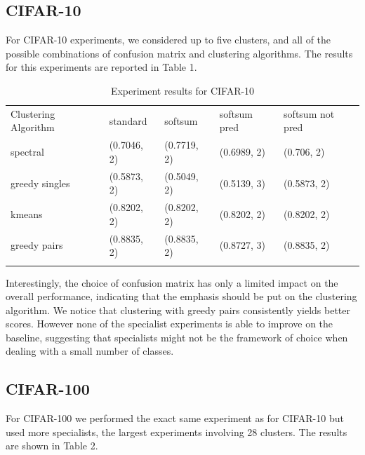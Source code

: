 \documentclass[graybox]{styles/svmult}
\begin{document}
\subsection{CIFAR-10}\label{cifar-10}

For CIFAR-10 experiments, we considered up to five clusters, and all of
the possible combinations of confusion matrix and clustering algorithms.
The results for this experiments are reported in Table 1.

\begin{table}
\caption{Experiment results for CIFAR-10}
\label{tab:1}       %
\begin{tabular}{p{3.2cm}p{2.0cm}p{2.0cm}p{2.0cm}p{2.0cm}}
\hline\noalign{\smallskip}
Clustering Algorithm & standard & softsum & softsum pred & softsum not pred \\
\noalign{\smallskip}\svhline\noalign{\smallskip}
spectral & (0.7046, 2) & (0.7719, 2) & (0.6989, 2) & (0.706, 2) \\
greedy singles & (0.5873, 2) & (0.5049, 2) & (0.5139, 3) & (0.5873, 2) \\
kmeans & (0.8202, 2) & (0.8202, 2) & (0.8202, 2) & (0.8202, 2) \\
greedy pairs & (0.8835, 2) & (0.8835, 2) & (0.8727, 3) & (0.8835, 2) \\
\noalign{\smallskip}\hline\noalign{\smallskip}
\end{tabular}
\end{table}

Interestingly, the choice of confusion matrix has only a limited impact
on the overall performance, indicating that the emphasis should be put
on the clustering algorithm. We notice that clustering with greedy pairs
consistently yields better scores. However none of the specialist
experiments is able to improve on the baseline, suggesting that
specialists might not be the framework of choice when dealing with a
small number of classes.

\subsection{CIFAR-100}\label{cifar-100}

For CIFAR-100 we performed the exact same experiment as for CIFAR-10 but
used more specialists, the largest experiments involving 28 clusters.
The results are shown in Table 2.
\end{document}
